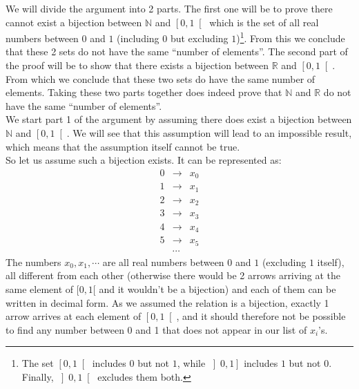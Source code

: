 \noindent We will divide the argument into 2 parts. The first one will be to prove there cannot exist a bijection between $\mathbb{N}$ and $\left[ 0 , 1 \right[$ which is the set of all real numbers between $0$ and $1$ (including $0$ but excluding $1$)\footnote{The set $\left[ 0,1 \right[$ includes $0$ but not $1$, while $\left] 0,1 \right]$ includes $1$ but not $0$. Finally, $\left] 0,1 \right[$ excludes them both.}. From this we conclude that these 2 sets do not have the same "`number of elements"'. The second part of the proof will be to show that there exists a bijection between $\mathbb{R}$ and $\left[  0,1 \right[$. From which we conclude that these two sets do have the same number of elements. Taking these two parts together does indeed prove that $\mathbb{N}$ and $\mathbb{R}$ do not have the same "`number of elements"'.\\

\noindent We start part 1 of the argument by assuming there does exist a bijection between $\mathbb{N}$ and $\left[ 0,1 \right[$. We will see that this assumption will lead to an impossible result, which means that the assumption itself cannot be true.\\

\noindent So let us assume such a bijection exists. It can be represented as:
\begin{eqnarray*}
0 & \rightarrow & x_0  \\
1 & \rightarrow & x_1  \\
2 & \rightarrow & x_2 \\
3 & \rightarrow & x_3  \\
4 & \rightarrow & x_4  \\
5 & \rightarrow & x_5  \\
 & \cdots & 
\end{eqnarray*}
The numbers $x_0, x_1,\cdots$ are all real numbers between $0$ and $1$ (excluding $1$ itself), all different from each other (otherwise there would be 2 arrows arriving at the same element of $[0,1[$ and it wouldn't be a bijection) and each of them can be written in decimal form. As we assumed the relation is a bijection, exactly 1 arrow arrives at each element of $\left[ 0,1 \right[$, and it should therefore not be possible to find any number between 0 and 1 that does not appear in our list of $x_i$'s.\\

